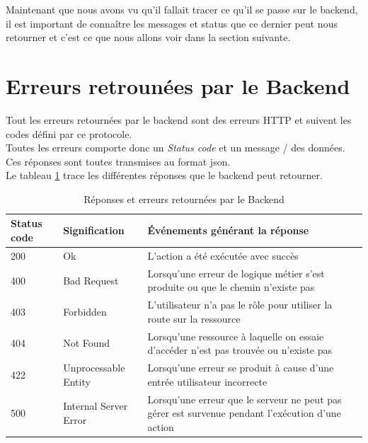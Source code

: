 \documentclass[
    iai, %
    il, %
]{heig-tb}
\begin{document}
Maintenant que nous avons vu qu'il fallait tracer ce qu'il se passe sur le \Gls{backend}, il est important de connaître les messages et status que ce dernier peut nous retourner et c'est ce que nous allons voir dans la section suivante.

\section{Erreurs retrounées par le Backend}
Tout les erreurs retournées par le \Gls{backend} sont des erreurs HTTP et suivent les codes défini par ce protocole. \\
Toutes les erreurs comporte donc un \emph{Status code} et un message / des données. Ces réponses sont toutes transmises au format \Gls{json}. \\
Le tableau \ref{reponses-erreurs-backend} trace les différentes réponses que le \Gls{backend} peut retourner.

\begin{table}[h]
    \begin{center}
        \caption{Réponses et erreurs retournées par le Backend \label{reponses-erreurs-backend}}
        \begin{tabularx}{1.0\textwidth} {l|l|X}
            Status code & Signification         & Événements générant la réponse                                                                   \\ \hline
            200         & Ok                    & L'action a été exécutée avec succès                                                              \\
            400         & Bad Request           & Lorsqu'une erreur de logique métier s'est produite ou que le chemin n'existe pas                 \\
            403         & Forbidden             & L'utilisateur n'a pas le rôle pour utiliser la route sur la ressource                            \\
            404         & Not Found             & Lorsqu'une ressource à laquelle on essaie d'accéder n'est pas trouvée ou n'existe pas            \\
            422         & Unprocessable Entity  & Lorsqu'une erreur se produit à cause d'une entrée utilisateur incorrecte                         \\
            500         & Internal Server Error & Lorsqu'une erreur que le serveur ne peut pas gérer est survenue pendant l'exécution d'une action \\
        \end{tabularx}
    \end{center}
\end{table}
\end{document}
